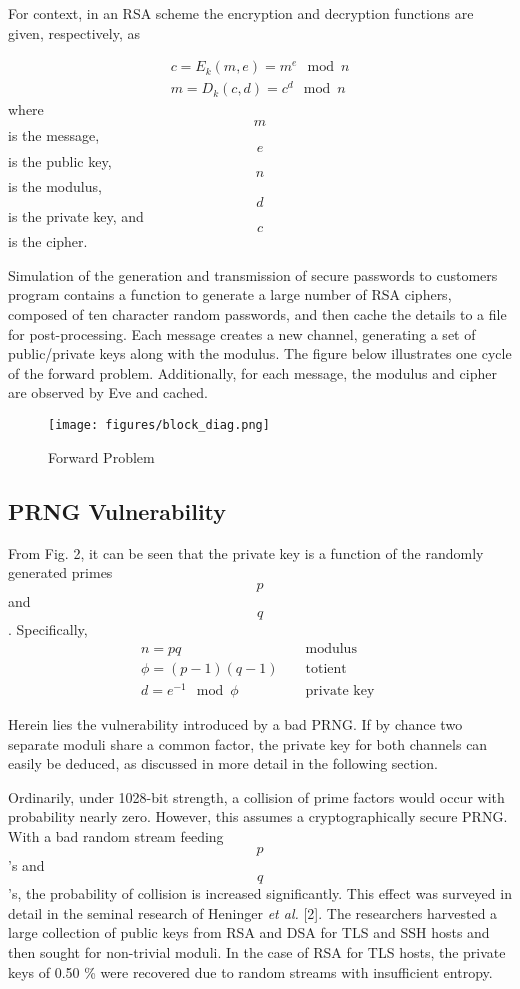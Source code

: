 \documentclass[conference]{/Users/paul/MSEE/ee595/project/report/IEEEtran/IEEEtran}
\begin{document}
For context, in an RSA scheme the encryption and decryption functions are given, respectively, as

\begin{align}
    c = E_k(m, e) = m^e \mod n\\
    m = D_k(c, d) = c^d \mod n
\end{align}
where $$m$$ is the message, $$e$$ is the public key, $$n$$ is the modulus, $$d$$ is the private key, and $$c$$ is the cipher. 

    Simulation of the generation and transmission of secure passwords to customers program contains a function to generate a large number of RSA ciphers, composed of ten character random passwords, and then cache the details to a file for post-processing. Each message creates a new channel, generating a set of public/private keys along with the modulus. The figure below illustrates one cycle of the forward problem.
Additionally, for each message, the modulus and cipher are observed by Eve and cached. 
 
\begin{figure}[h]
    \texttt{[image: figures/block\_diag.png]}%
    \caption{Forward Problem}
\end{figure}
 
\subsection{PRNG Vulnerability}
From Fig. 2, it can be seen that the private key is a function of the randomly generated primes $$p$$ and $$q$$. Specifically, 
\begin{align}
    n = pq && \text{ modulus } \\
    \phi = (p-1)(q-1) && \text{ totient } \\
    d = e^{-1} \mod \phi && \text{ private key }
\end{align}
 
Herein lies the vulnerability introduced by a bad PRNG. If by chance two separate moduli share a common factor, the private key for both channels can easily be deduced, as discussed in more detail in the following section. 

    Ordinarily, under 1028-bit strength, a collision of prime factors would occur with probability nearly zero. However, this assumes a cryptographically secure PRNG. With a bad random stream feeding $$p$$'s and $$q$$'s, the probability of collision is increased significantly. This effect was surveyed in detail in the seminal research of Heninger \textit{et al.} [2]. The researchers harvested a large collection of public keys from RSA and DSA for TLS and SSH hosts and then sought for non-trivial moduli. In the case of RSA for TLS hosts, the private keys of 0.50 \% were recovered due to random streams with insufficient entropy.  
\end{document}
